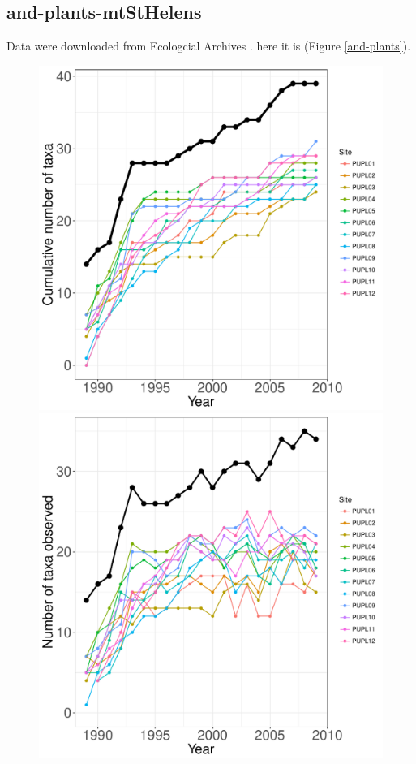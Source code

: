 \documentclass[11pt, oneside]{article}
\begin{document}
\subsection {and-plants-mtStHelens}
Data were downloaded from Ecologcial Archives \citep{and-plants}.
here it is (Figure \ref{and-plants}).

\begin{figure}[h!]
\centering
\includegraphics[scale = 0.4]{and-plants-mtStHelens_species_accumulation_curve.pdf}
\includegraphics[scale = 0.4]{and-plants-mtStHelens_num_taxa_over_time.pdf}

\end{figure}
\end{document}
